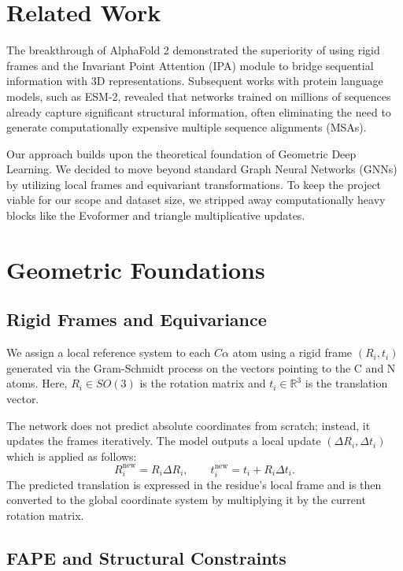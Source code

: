 \documentclass{article}
\begin{document}
\section{Related Work}
\label{sec:related}

The breakthrough of AlphaFold 2 demonstrated the superiority of using rigid frames and the Invariant Point Attention (IPA) module to bridge sequential information with 3D representations. Subsequent works with protein language models, such as ESM-2, revealed that networks trained on millions of sequences already capture significant structural information, often eliminating the need to generate computationally expensive multiple sequence alignments (MSAs).

Our approach builds upon the theoretical foundation of Geometric Deep Learning. We decided to move beyond standard Graph Neural Networks (GNNs) by utilizing local frames and equivariant transformations. To keep the project viable for our scope and dataset size, we stripped away computationally heavy blocks like the Evoformer and triangle multiplicative updates.

\section{Geometric Foundations}
\label{sec:background}

\subsection{Rigid Frames and Equivariance}

We assign a local reference system to each $C\alpha$ atom using a rigid frame $(R_i,t_i)$ generated via the Gram-Schmidt process on the vectors pointing to the C and N atoms. Here, $R_i \in SO(3)$ is the rotation matrix and $t_i \in \mathbb{R}^3$ is the translation vector. 

The network does not predict absolute coordinates from scratch; instead, it updates the frames iteratively. The model outputs a local update $(\Delta R_i,\Delta t_i)$ which is applied as follows:
\begin{equation}
R_i^{\text{new}} = R_i \Delta R_i, \qquad
t_i^{\text{new}} = t_i + R_i \Delta t_i.
\end{equation}
The predicted translation is expressed in the residue's local frame and is then converted to the global coordinate system by multiplying it by the current rotation matrix.

\subsection{FAPE and Structural Constraints}
\end{document}
